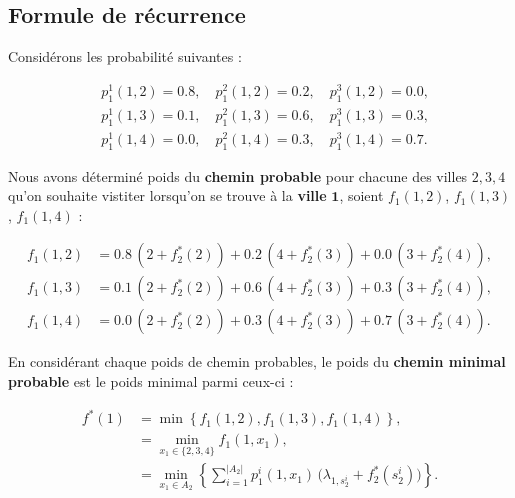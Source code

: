 \documentclass{report}
\begin{document}
\begin{multicols*}{2}
\begin{center}
\end{center}    



\subsection{Formule de récurrence}

    Considérons les probabilité suivantes :

\[
\begin{aligned}
    &p_1^1(1, 2) = 0.8, \quad p_1^2(1, 2) = 0.2, \quad p_1^3(1, 2) = 0.0, \\
    &p_1^1(1, 3) = 0.1, \quad p_1^2(1, 3) = 0.6, \quad p_1^3(1, 3) = 0.3, \\
    &p_1^1(1, 4) = 0.0, \quad p_1^2(1, 4) = 0.3, \quad p_1^3(1, 4) = 0.7.
\end{aligned}
\]

    Nous avons déterminé poids du \textbf{chemin probable}   pour chacune 
    des villes $2, 3, 4$ qu'on souhaite vistiter lorsqu'on se trouve
    à la \textbf{ville} $\boldsymbol{1}$, soient $f_1(1,2)$, $f_1(1,3)$, $f_1(1,4)$  :                  

    \[%
    \begin{aligned}
        f_1(1, 2) &= 0.8 \, (2 + f_2^*(2)) + 0.2 \, (4 + f_2^*(3)) + 0.0\, (3 + f_2^*(4)), \\
        f_1(1, 3) &= 0.1 \, (2 + f_2^*(2)) + 0.6 \, (4 + f_2^*(3)) + 0.3 \, (3 + f_2^*(4)), \\
        f_1(1, 4) &= 0.0 \, (2 + f_2^*(2)) + 0.3 \, (4 + f_2^*(3)) + 0.7 \, (3 + f_2^*(4)).
    \end{aligned}
    \]%

    En considérant chaque poids de chemin probables, 
    le poids du \textbf{chemin minimal probable} est 
    le poids minimal parmi ceux-ci :

    \[%
    \begin{aligned}
        f^*(1) &= \min \left\{ f_1(1, 2), f_1(1, 3), f_1(1, 4) \right\}, \\
               &= \min_{x_1 \in \{2, 3, 4\}} f_1(1, x_1), \\
               &= \min_{x_1 \in A_2} \left\{ \sum_{i=1}^{|A_2|} p_1^i(1, x_1) \, \big( \lambda_{1,s_2^i} + f_2^*(s_2^i) \big) \right\}.
    \end{aligned}
    \]%


\end{multicols*}
\end{document}
